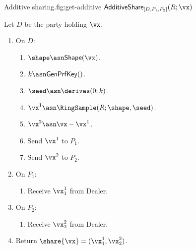 \begin{Boxfig}{Additive sharing.}{fig:get-additive}
  {$\mathsf{AdditiveShare}_{[D, P_1, P_2]}(R; \vx)$}
  
  Let $D$ be the party holding $\vx$.
  
  \begin{enumerate}
    \item On $D$:
  \begin{enumerate}
    \item $\shape \asn \mathsf{Shape}(\vx)$.
    \item $k \asn \mathsf{GenPrfKey}()$.
    \item $\seed \asn \derives(0; k)$.
    \item $\vx^1 \asn \RingSample(R; \shape, \seed)$.
    \item $\vx^2 \asn \vx - \vx^1$.
    \item Send $\vx^1$ to $P_1$.
    \item Send $\vx^2$ to $P_2$.
  \end{enumerate}
  \item On $P_1$:
  \begin{enumerate}
      \item Receive $\vx^1_1$ from Dealer.
  \end{enumerate}
  \item On $P_2$:
  \begin{enumerate}
      \item Receive $\vx^2_2$ from Dealer.
  \end{enumerate}
  \item Return $\share{\vx} = (\vx^1_1, \vx^2_2)$.
\end{enumerate}
\end{Boxfig}


